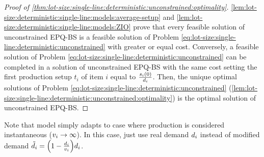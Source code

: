 \begin{proof}[Proof of \cref{thm:lot-size:single-line:deterministic:unconstrained:optimality}]
\cref{lem:lot-size:deterministic:single-line:models:average-setup} and \cref{lem:lot-size:deterministic:single-line:models:ZIO} prove that every feasible solution of unconstrained EPQ-BS is a feasible solution of Problem \ref{eq:lot-size:single-line:deterministic:unconstrained} with greater or equal cost.
Conversely, a feasible solution of Problem \ref{eq:lot-size:single-line:deterministic:unconstrained} can be completed in a solution of unconstrained EPQ-BS with the same cost setting the first production setup $t_i$ of item $i$ equal to $\frac{s_i(0)}{d_i}$.
Then, the unique optimal solutions of Problem \ref{eq:lot-size:single-line:deterministic:unconstrained} (\cref{lem:lot-size:single-line:deterministic:unconstrained:optimality}) is the optimal solution of unconstrained EPQ-BS.
\end{proof}


\medskip


Note that model simply adapts to case where production is considered instantaneous (\ie $v_i\rightarrow\infty$).
In this case, just use real demand $d_i$ instead of modified demand $\tilde{\demand}_i=\bracket{1-\frac{\demand_i}{\rate_i}}\demand_i$.










